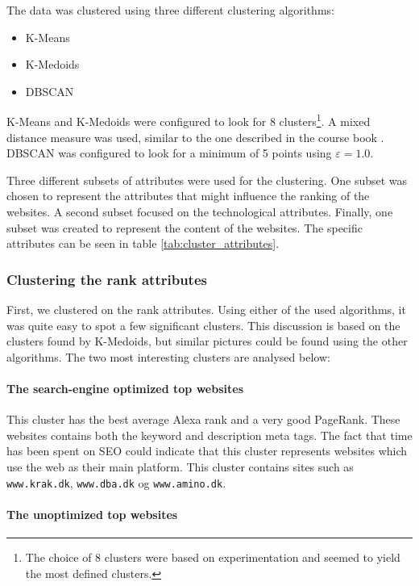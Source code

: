 The data was clustered using three different clustering algorithms:

\begin{itemize}
\item K-Means
\item K-Medoids
\item DBSCAN
\end{itemize}

K-Means and K-Medoids were configured to look for 8 clusters\footnote{The choice of 8 clusters were based on experimentation and seemed to yield the most defined clusters.}. A mixed distance measure was used, similar to the one described in the course book \cite{book}. DBSCAN was configured to look for a minimum of 5 points using $\varepsilon = 1.0$.

Three different subsets of attributes were used for the clustering. One subset was chosen to represent the attributes that might influence the ranking of the websites. A second subset focused on the technological attributes. Finally, one subset was created to represent the content of the websites. The specific attributes can be seen in table \ref{tab:cluster_attributes}.



\subsubsection{Clustering the rank attributes}

First, we clustered on the rank attributes. Using either of the used algorithms, it was quite easy to spot a few significant clusters. This discussion is based on the clusters found by K-Medoids, but similar pictures could be found using the other algorithms. The two most interesting clusters are analysed below:

\paragraph{The search-engine optimized top websites} 

This cluster has the best average Alexa rank and a very good PageRank. These websites contains both the keyword and description meta tags. The fact that time has been spent on SEO could indicate that this cluster represents websites which use the web as their main platform. This cluster contains sites such as \verb|www.krak.dk|, \verb|www.dba.dk| og \verb|www.amino.dk|.

\paragraph{The unoptimized top websites} 

